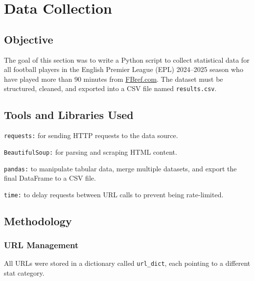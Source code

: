 \documentclass[12pt,a4paper]{report}
\begin{document}

\tableofcontents

\cleardoublepage  %
\listoffigures


\chapter{Data Collection}
\section{Objective}
The goal of this section was to write a Python script to collect statistical data for all football players in the English Premier League (EPL) 2024--2025 season who have played more than 90 minutes from \href{https://fbref.com/en/}{FBref.com}. The dataset must be structured, cleaned, and exported into a CSV file named \texttt{results.csv}.

\section{Tools and Libraries Used}
   \texttt{requests:} for sending HTTP requests to the data source.
   
   \texttt{BeautifulSoup:} for parsing and scraping HTML content.
   
   \texttt{pandas:} to manipulate tabular data, merge multiple datasets, and export the final DataFrame to a CSV file.
   
   \texttt{time:} to delay requests between URL calls to prevent being rate-limited.

\section{Methodology}
\subsection{URL Management}
All URLs were stored in a dictionary called \texttt{url\_dict}, each pointing to a different stat category.
\end{document}
